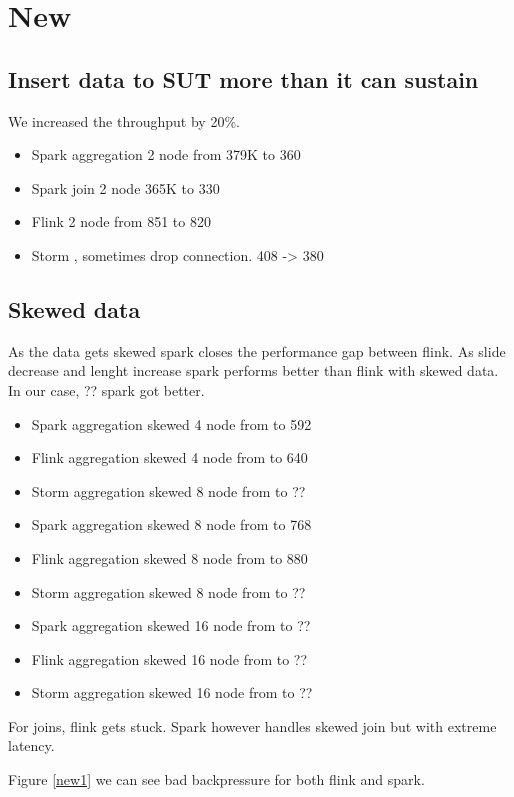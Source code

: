 \section{New }


\subsection{Insert data to SUT more than it can sustain}

We increased the throughput by 20\%.
\begin{itemize}
	\item Spark aggregation 2 node from 379K to 360
	\item Spark join 2 node 365K to 330
	\item Flink 2 node from 851 to 820
	\item Storm , sometimes drop connection.  408 -> 380
	\end{itemize}


\subsection{Skewed data}
As the data gets skewed spark closes the performance gap between flink. As slide decrease and lenght increase spark performs better than flink with skewed data. In our case, ?? spark got better. 

\begin{itemize}
	\item Spark aggregation skewed  4 node from  to 592
	\item Flink aggregation skewed  4 node from  to 640
	\item Storm aggregation skewed  8 node from  to ??
	
	\item Spark aggregation skewed  8 node from  to 768
	\item Flink aggregation skewed  8 node from  to 880
	\item Storm aggregation skewed  8 node from  to ??
	
	\item Spark aggregation skewed  16 node from  to ??
	\item Flink aggregation skewed  16 node from  to ??
	\item Storm aggregation skewed  16 node from  to ??

\end{itemize}


For joins, flink gets stuck. Spark however handles skewed join but with extreme latency. 



Figure \ref{new1} we can see bad backpressure for both flink and spark. 










